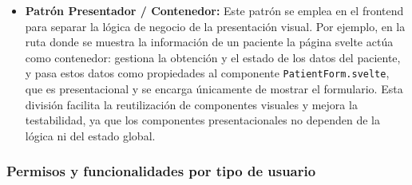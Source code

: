\documentclass[12pt, a4paper]{article}
\begin{document}
\begin{itemize}
	\item \textbf{Patrón Presentador / Contenedor:}  
	Este patrón se emplea en el frontend para separar la lógica de negocio de la presentación visual. Por ejemplo, en la ruta donde se muestra la información de un paciente la página svelte actúa como contenedor: gestiona la obtención y el estado de los datos del paciente, y pasa estos datos como propiedades al componente \texttt{PatientForm.svelte}, que es presentacional y se encarga únicamente de mostrar el formulario. Esta división facilita la reutilización de componentes visuales y mejora la testabilidad, ya que los componentes presentacionales no dependen de la lógica ni del estado global.

\end{itemize}

\subsubsection{Permisos y funcionalidades por tipo de usuario}
\end{document}
